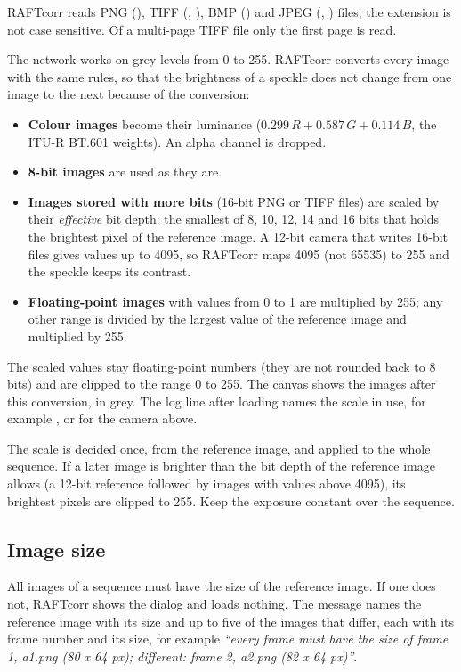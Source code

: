 RAFTcorr reads PNG (), TIFF (, ), BMP () and JPEG
(, ) files; the extension is not case sensitive. Of a multi-page TIFF file
only the first page is read.

The network works on grey levels from 0 to 255. RAFTcorr converts every image with the same
rules, so that the brightness of a speckle does not change from one image to the next because
of the conversion:
\begin{itemize}
  \item \textbf{Colour images} become their luminance ($0.299\,R + 0.587\,G + 0.114\,B$, the
        ITU-R BT.601 weights). An alpha channel is dropped.
  \item \textbf{8-bit images} are used as they are.
  \item \textbf{Images stored with more bits} (16-bit PNG or TIFF files) are scaled by their
        \emph{effective} bit depth: the smallest of 8, 10, 12, 14 and 16 bits that holds the
        brightest pixel of the reference image. A 12-bit camera that writes 16-bit files gives
        values up to 4095, so RAFTcorr maps 4095 (not 65535) to 255 and the speckle keeps its
        contrast.
  \item \textbf{Floating-point images} with values from 0 to 1 are multiplied by 255; any other
        range is divided by the largest value of the reference image and multiplied by 255.
\end{itemize}
The scaled values stay floating-point numbers (they are not rounded back to 8 bits) and are
clipped to the range 0 to 255. The canvas shows the images after this conversion, in grey. The
log line after loading names the scale in use, for example , or
 for the camera above.

\begin{notebox}
The scale is decided once, from the reference image, and applied to the whole sequence. If a
later image is brighter than the bit depth of the reference image allows (a 12-bit reference
followed by images with values above 4095), its brightest pixels are clipped to 255. Keep the
exposure constant over the sequence.
\end{notebox}

\subsection{Image size}

All images of a sequence must have the size of the reference image. If one does not, RAFTcorr
shows the  dialog and loads nothing. The message names the reference
image with its size and up to five of the images that differ, each with its frame number and its
size, for example \emph{``every frame must have the size of frame 1, a1.png (80 x 64 px);
different: frame 2, a2.png (82 x 64 px)''}.

